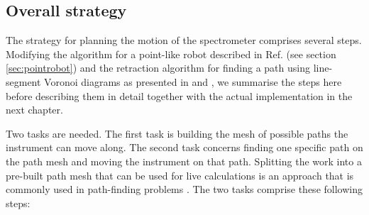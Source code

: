 \subsection{Overall strategy}
\label{sec:strategy}

The strategy for planning the motion of the spectrometer comprises several steps. 
Modifying the algorithm for a point-like robot described in Ref. 
\cite[Ch. 13, pp. 283-306]{Berg2008} (see section \ref{sec:pointrobot}) and the 
retraction algorithm for finding a path using line-segment Voronoi diagrams as 
presented in \cite[p. 163]{Berg2008} and \cite[pp. 247-251]{FUH_geo2020}, we 
summarise the steps here before describing them in detail together with the actual
implementation in the next chapter.

Two tasks are needed. The first task is building the mesh of possible paths the 
instrument can move along. 
The second task concerns finding one specific path on the path mesh and moving
the instrument on that path. 
Splitting the work into a pre-built path mesh that can be used for live calculations
is an approach that is commonly used in path-finding problems \cite{Hwang2003}.
The two tasks comprise these following steps:
